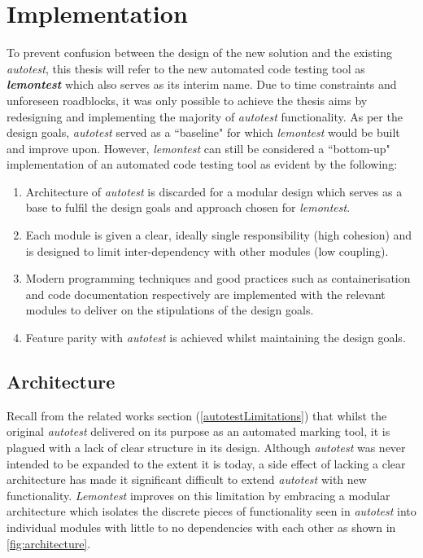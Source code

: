 \documentclass[hidelinks]{report}
\newcommand{\unchapter}[2]{
    \setcounter{chapter}{#1}
    \setcounter{section}{0}
    \chapter*{#2}
    \addcontentsline{toc}{chapter}{#2}
}
\begin{document}
\unchapter{5}{Implementation}
To prevent confusion between the design of the new solution and the existing \textit{autotest}, this thesis will refer to the new automated code testing tool as \textbf{\textit{lemontest}} which also serves as its interim name.
Due to time constraints and unforeseen roadblocks, it was only possible to achieve the thesis aims by redesigning and implementing the majority of \textit{autotest} functionality.
As per the design goals, \textit{autotest} served as a ``baseline" for which \textit{lemontest} would be built and improve upon. However, \textit{lemontest} can still be considered a ``bottom-up" implementation of an automated code testing tool as evident by the following:
\begin{enumerate}
	\item Architecture of \textit{autotest} is discarded for a modular design which serves as a base to fulfil the design goals and approach chosen for \textit{lemontest}.
	\item Each module is given a clear, ideally single responsibility (high cohesion) and is designed to limit inter-dependency with other modules (low coupling).
	\item Modern programming techniques and good practices such as containerisation and code documentation respectively are implemented with the relevant modules to deliver on the stipulations of the design goals.
	\item Feature parity with \textit{autotest} is achieved whilst maintaining the design goals.
\end{enumerate}

\section{Architecture}\label{architecture}
Recall from the related works section (\autoref{autotestLimitations}) that whilst the original \textit{autotest} delivered on its purpose as an automated marking tool, it is plagued with a lack of clear structure in its design. Although \textit{autotest} was never intended to be expanded to the extent it is today, a side effect of lacking a clear architecture has made it significant difficult to extend \textit{autotest} with new functionality. \textit{Lemontest} improves on this limitation by embracing a modular architecture which isolates the discrete pieces of functionality seen in \textit{autotest} into individual modules with little to no dependencies with each other as shown in \autoref{fig:architecture}.
\end{document}

